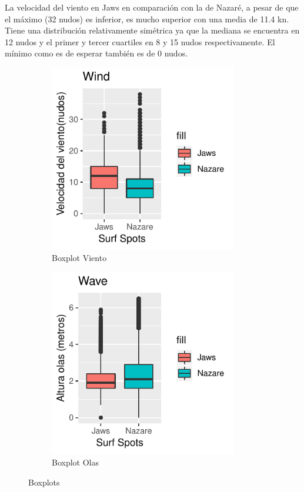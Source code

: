 La velocidad del viento en Jaws en comparación con la de Nazaré, a pesar de que el máximo (32 nudos) es inferior, es mucho superior con una media de 11.4 \si{\knot}. Tiene una distribución relativamente simétrica ya que la mediana se encuentra en 12 nudos y el primer y tercer cuartiles en 8 y 15 nudos respectivamente. El mínimo como es de esperar también es de 0 nudos.



\begin{figure}[H]
\begin{subfigure}{.49\textwidth}
\centering
\includegraphics[width=0.9\textwidth]{./figures/boxplot_wind.pdf}
  \caption{Boxplot Viento}
\label{fig:boxplot_wind}
\end{subfigure}%
\begin{subfigure}{.49\textwidth}
\centering
\includegraphics[width=0.9\textwidth]{./figures/boxplot_wave.pdf}
  \caption{Boxplot Olas}
\label{fig:boxplot_wave}
\end{subfigure}
\caption{Boxplots}
\end{figure}

